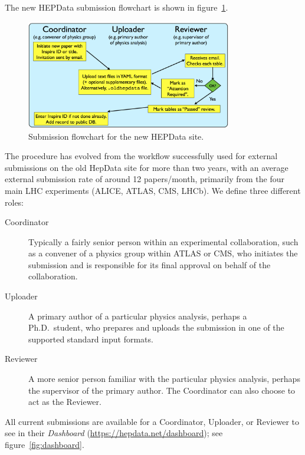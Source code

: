 \documentclass[a4paper]{jpconf}
\begin{document}
The new HEPData submission flowchart is shown in figure~\ref{fig:submission}.
%
\begin{figure}
  \begin{center}
    \includegraphics[width=0.8\textwidth]{Figures/submission_flowchart.pdf}
  \end{center}
  \caption{\label{fig:submission}Submission flowchart for the new HEPData site.}
\end{figure}
%
The procedure has evolved from the workflow successfully used for external
submissions on the old HepData site for more than two years, with an average
external submission rate of around 12 papers/month, primarily from the four
main LHC experiments (ALICE, ATLAS, CMS, LHCb).  We define three different
roles:
%
\begin{description}
\item [Coordinator] Typically a fairly senior person within an experimental
collaboration, such as a convener of a physics group within ATLAS or CMS, who
initiates the submission and is responsible for its final approval on behalf of
the collaboration.
\item [Uploader] A primary author of a particular physics analysis, perhaps a
Ph.D.~student, who prepares and uploads the submission in one of the supported
standard input formats.
\item [Reviewer] A more senior person familiar with the particular physics
analysis, perhaps the supervisor of the primary author.  The Coordinator can
also choose to act as the Reviewer.
\end{description}
%
All current submissions are available for a Coordinator, Uploader, or Reviewer
to see in their \emph{Dashboard} (\url{https://hepdata.net/dashboard}); see
figure~\ref{fig:dashboard}.
%
\end{document}
